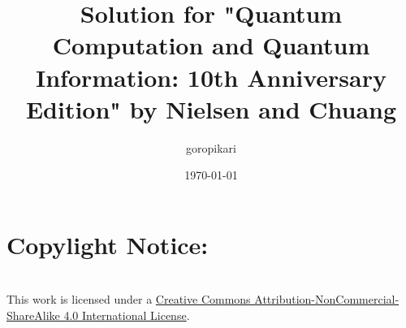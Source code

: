 \documentclass[11pt]{book}
\title{Solution for "Quantum Computation and Quantum Information: 10th Anniversary Edition" by Nielsen and Chuang}
\author{goropikari}
\date{\today}
\begin{document}
\maketitle
\thispagestyle{empty}
\setcounter{page}{0} %

\section*{Copylight Notice:}
\ccbyncsa\\
This work is licensed under a \href{http://creativecommons.org/licenses/by-nc-sa/4.0/}{Creative Commons Attribution-NonCommercial-ShareAlike 4.0 International License}.

\tableofcontents
\newpage





%
\end{document}
